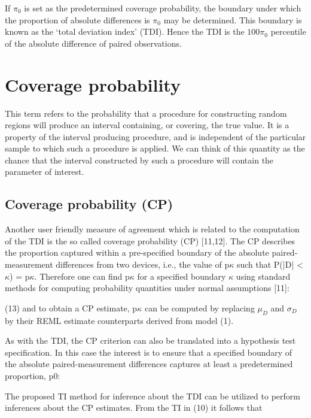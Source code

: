 \documentclass[12pt, a4paper]{report}
\theoremstyle{plain}
\theoremstyle{definition}
\theoremstyle{remark}
\begin{document}
	If $\pi_{0}$ is set as the predetermined coverage probability, the
	boundary under which the proportion of absolute differences is
	$\pi_{0}$ may be determined. This boundary is known as the `total
	deviation index' (TDI). Hence the TDI is the $100\pi_{0}$
	percentile of the absolute difference of paired observations.
	
	
	
	
	\section{Coverage probability}
	This term refers to the probability that a procedure for 
	constructing random regions will produce an interval containing, or covering, the 
	true value. It is a property of the interval producing procedure, and is 
	independent of the particular sample to which such a procedure is applied. We 
	can think of this quantity as the chance that the interval constructed by such a 
	procedure will contain the parameter of interest.
	
	
	
	\subsection*{Coverage probability (CP)}
	Another user friendly measure of agreement which is related to the computation of the TDI is the so called coverage probability (CP) [11,12]. 
	The CP describes the proportion captured within a pre-specified boundary of the absolute paired-measurement differences from two devices, i.e., the value of p$\kappa$ such that P(|D| < $\kappa$) = p$\kappa$. Therefore one can find p$\kappa$ for a specified boundary $\kappa$ using standard methods for computing probability quantities under normal assumptions [11]:
	
	(13)
	and to obtain a CP estimate, p$\kappa$ can be computed by replacing $\mu_D$ and $\sigma_D$ by their REML estimate counterparts derived from model (1).
	
	As with the TDI, the CP criterion can also be translated into a hypothesis test specification. 
	In this case the interest is to ensure that a specified boundary of the absolute paired-measurement differences captures at least a predetermined proportion, p0:
	
	
	The proposed TI method for inference about the TDI can be utilized to perform inferences about the CP estimates. From the TI in (10) it follows that
	
\end{document}
